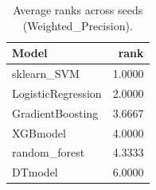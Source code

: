 \begin{table}[t]
\centering
\begin{tabular}{lr}
\toprule
Model & rank \\
\midrule
sklearn_SVM & 1.0000 \\
LogisticRegression & 2.0000 \\
GradientBoosting & 3.6667 \\
XGBmodel & 4.0000 \\
random_forest & 4.3333 \\
DTmodel & 6.0000 \\
\bottomrule
\end{tabular}
\caption{Average ranks across seeds (Weighted_Precision).}
\label{tab:avg_rank_Weighted_Precision}
\end{table}